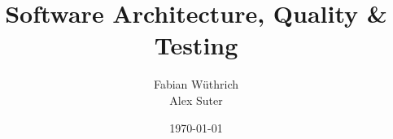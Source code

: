 \titlehead{Hochschule Luzern \\ 
	Technik \& Architektur}
\subject{Zusammenfassung}
\title{Software Architecture, Quality \& Testing}
\subtitle{}
\author{Fabian Wüthrich \\ 
	Alex Suter}
\date{\today}

\maketitle